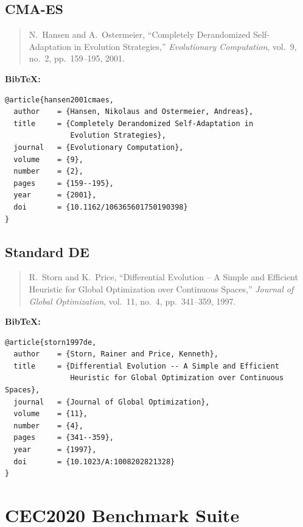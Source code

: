\documentclass[11pt]{article}
\begin{document}
\subsection{CMA-ES}

\begin{quote}
N.~Hansen and A.~Ostermeier, 
``Completely Derandomized Self-Adaptation in Evolution Strategies,'' 
\textit{Evolutionary Computation}, vol.~9, no.~2, pp.~159--195, 2001.
\end{quote}

\noindent\textbf{BibTeX:}
\begin{verbatim}
@article{hansen2001cmaes,
  author    = {Hansen, Nikolaus and Ostermeier, Andreas},
  title     = {Completely Derandomized Self-Adaptation in 
               Evolution Strategies},
  journal   = {Evolutionary Computation},
  volume    = {9},
  number    = {2},
  pages     = {159--195},
  year      = {2001},
  doi       = {10.1162/106365601750190398}
}
\end{verbatim}

\subsection{Standard DE}

\begin{quote}
R.~Storn and K.~Price, 
``Differential Evolution -- A Simple and Efficient Heuristic for Global Optimization over Continuous Spaces,'' 
\textit{Journal of Global Optimization}, vol.~11, no.~4, pp.~341--359, 1997.
\end{quote}

\noindent\textbf{BibTeX:}
\begin{verbatim}
@article{storn1997de,
  author    = {Storn, Rainer and Price, Kenneth},
  title     = {Differential Evolution -- A Simple and Efficient 
               Heuristic for Global Optimization over Continuous Spaces},
  journal   = {Journal of Global Optimization},
  volume    = {11},
  number    = {4},
  pages     = {341--359},
  year      = {1997},
  doi       = {10.1023/A:1008202821328}
}
\end{verbatim}

\section{CEC2020 Benchmark Suite}
\end{document}
